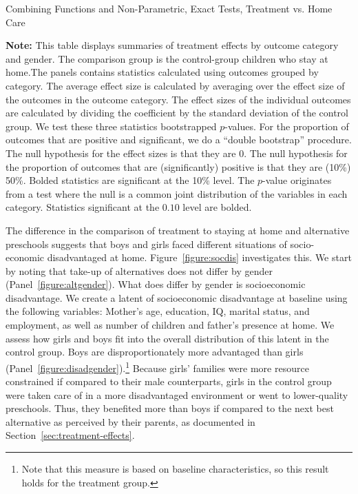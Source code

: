 \begin{table}[!htpb]
\begin{threeparttable}
\caption{Combining Functions and Non-Parametric, Exact Tests, Treatment vs. Home Care} \label{table:massivehome}
\centering
  
\begin{tablenotes}
\footnotesize
\item  \footnotesize \textbf{Note:} This table displays summaries of treatment effects by outcome category and gender. The comparison group is the control-group children who stay at home.The panels contains statistics calculated using outcomes grouped by category. The average effect size is calculated by averaging over the effect size of the outcomes in the outcome category. The effect sizes of the individual outcomes are calculated by dividing the coefficient by the standard deviation of the control group. We test these three statistics bootstrapped $p$-values. For the proportion of outcomes that are positive and significant, we do a ``double bootstrap'' procedure. The null hypothesis for the effect sizes is that they are 0. The null hypothesis for the proportion of outcomes that are (significantly) positive is that they are (10\%) 50\%. Bolded statistics are significant at the 10\% level. The \citet{Rosenbaum_2005_Distribution_JRSS} $p$-value originates from a test where the null is a common joint distribution of the variables in each category. Statistics significant at the $0.10$ level are bolded.
\end{tablenotes}
\end{threeparttable}
\end{table}

The difference in the comparison of treatment to staying at home and alternative preschools suggests that boys and girls faced different situations of socio-economic disadvantaged at home. Figure~\ref{figure:socdis} investigates this. We start by noting that take-up of alternatives does not differ by gender (Panel~\ref{figure:altgender}). What does differ by gender is socioeconomic disadvantage. We create a latent of socioeconomic disadvantage at baseline using the following variables: Mother's age, education, IQ, marital status, and employment, as well as number of children and father's presence at home. We assess how girls and boys fit into the overall distribution of this latent in the control group. Boys are disproportionately more advantaged than girls (Panel~\ref{figure:disadgender}).\footnote{Note that this measure is based on baseline characteristics, so this result holds for the treatment group.} Because girls' families were more resource constrained if compared to their male counterparts, girls in the control group were taken care of in a more disadvantaged environment or went to lower-quality preschools. Thus, they benefited more than boys if compared to the next best alternative as perceived by their parents, as documented in Section~\ref{sec:treatment-effects}.

